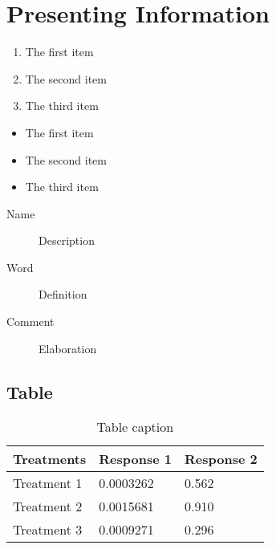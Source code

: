 \documentclass[11pt,twoside]{book} %
\begin{document}

\chapter{Presenting Information}


\begin{enumerate}
    \item The first item
    \item The second item
    \item The third item
\end{enumerate}


\begin{itemize}
    \item The first item
    \item The second item
    \item The third item
\end{itemize}

\begin{description}
    \item[Name] Description
    \item[Word] Definition
    \item[Comment] Elaboration
\end{description}

\section{Table}

\begin{table}[h]
    \centering
    \begin{tabular}{l l l}
        \toprule
        \textbf{Treatments} & \textbf{Response 1} & \textbf{Response 2} \\
        \midrule
        Treatment 1         & 0.0003262           & 0.562               \\
        Treatment 2         & 0.0015681           & 0.910               \\
        Treatment 3         & 0.0009271           & 0.296               \\
        \bottomrule
    \end{tabular}
    \caption{Table caption}
    \label{tab:example} %
\end{table}
\end{document}
